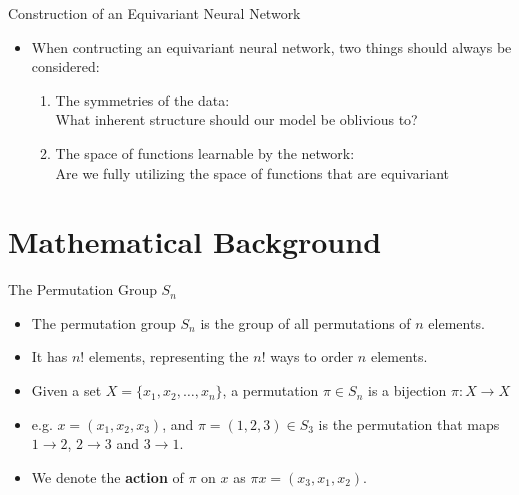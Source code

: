 \documentclass{beamer}
\begin{document}
\begin{frame}{Construction of an Equivariant Neural Network}

    \begin{itemize}
        \setlength{\itemsep}{\fill}
        \item When contructing an equivariant neural network, two things should always be considered:
        \begin{enumerate}
            \item The symmetries of the data:\\
                What inherent structure should our model be oblivious to?
            \item The space of functions learnable by the network:\\ 
                Are we fully utilizing the space of functions that are equivariant 
        \end{enumerate} 
    \end{itemize}
    
\end{frame}

\section{Mathematical Background}




\begin{frame}{The Permutation Group $S_n$}

    \begin{itemize}
        \setlength{\itemsep}{\fill}
        \item The permutation group $S_n$ is the group of all permutations of $n$ elements.
        \item It has $n!$ elements, representing the $n!$ ways to order $n$ elements.
        \item Given a set $X = \{x_1, x_2, \ldots, x_n\}$, a permutation $\pi \in S_n$ is a bijection $\pi: X \rightarrow X$
        \item e.g. $x = (x_1, x_2, x_3)$, and $\pi = (1, 2, 3) \in S_3$ is the permutation that maps $1 \rightarrow 2$, $2 \rightarrow 3$ and $3 \rightarrow 1$.
        \item We denote the \textbf{action} of $\pi$ on $x$ as $\pi x = (x_3, x_1, x_2)$. 
    \end{itemize}

    
\end{frame}
\end{document}

